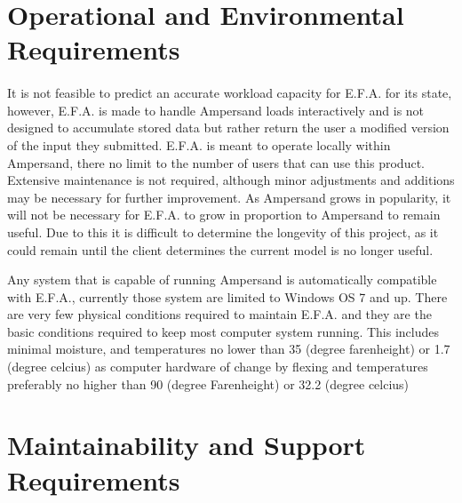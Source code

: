 \documentclass[12pt]{report}
\begin{document}
\section{Operational and Environmental Requirements}\label{sec:Operational}
\paragraph*{}
It is not feasible to predict an accurate workload capacity for E.F.A. for its state, however, 
E.F.A. is made to handle Ampersand loads interactively and is not designed to accumulate stored 
data but rather return the user a modified version of the input they submitted. E.F.A. is meant to 
operate locally within Ampersand, there no limit to the number of users that can use this product. 
Extensive maintenance is not required, although minor adjustments and additions may be necessary 
for further improvement. As Ampersand grows in popularity, it will not be necessary for E.F.A. to 
grow in proportion to Ampersand to remain useful. Due to this it is difficult to determine the 
longevity of this project, as it could remain until the client determines the current model is no 
longer useful. 

Any system that is capable of running Ampersand is automatically compatible with E.F.A., currently 
those system are limited to Windows OS 7 and up. There are very few physical conditions required to 
maintain E.F.A. and they are the basic conditions required to keep most computer system running. 
This includes minimal moisture, and temperatures no lower than 35 (degree farenheight) or 1.7 
(degree celcius) %
as computer hardware of change by flexing 
 and 
temperatures preferably no higher than 90 (degree Farenheight) or 32.2 (degree celcius)

\section{Maintainability and Support Requirements}\label{sec:Support}
\end{document}
